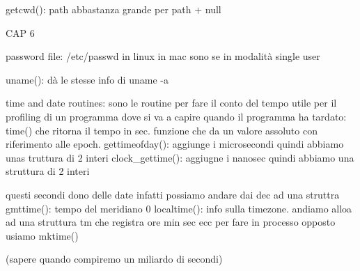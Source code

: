 getcwd():
path abbastanza grande per path + null 



CAP 6

password file:
/etc/passwd in linux in mac sono se in modalità single user


uname():
dà le stesse info di uname -a


time and date routines:
sono le routine per fare il conto del tempo utile per il profiling di un programma dove si va a capire quando il programma ha tardato:
time() che ritorna il tempo in sec. funzione che da un valore assoluto con riferimento alle epoch. 
gettimeofday(): aggiunge i microsecondi quindi abbiamo unas truttura di 2 interi
clock\_gettime(): aggiugne i nanosec quindi abbiamo una struttura di 2 interi

questi secondi dono delle date infatti possiamo andare dai dec ad una struttra gmttime(): tempo del meridiano 0 localtime(): info sulla timezone. andiamo alloa ad una struttura tm che registra ore min sec ecc per fare in processo opposto usiamo mktime()



(sapere quando compiremo un miliardo di secondi)